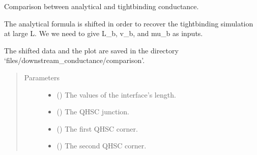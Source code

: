 \documentclass[letterpaper,10pt,english]{sphinxmanual}
\begin{document}

\begin{fulllineitems}
\label{\detokenize{modules:modules.utils.plot_downstream_conductance_comparison}}
\pysigstartsignatures
{}
\pysigstopsignatures
\sphinxAtStartPar
Comparison between analytical and tight\sphinxhyphen{}binding conductance.

\sphinxAtStartPar
The analytical formula is shifted in order to recover the tight\sphinxhyphen{}binding simulation at large L.
We we need to give L\_b, v\_b, and mu\_b as inputs.

\sphinxAtStartPar
The shifted data and the plot are saved in the directory ‘files/downstream\_conductance/comparison’.
\begin{quote}\begin{description}
\item[{Parameters}] \leavevmode\begin{itemize}
\item {} 
\sphinxAtStartPar
{} () \textendash{} The values of the interface’s length.

\item {} 
\sphinxAtStartPar
{} () \textendash{} The QH\sphinxhyphen{}SC junction.

\item {} 
\sphinxAtStartPar
{} () \textendash{} The first QH\sphinxhyphen{}SC corner.

\item {} 
\sphinxAtStartPar
{} () \textendash{} The second QH\sphinxhyphen{}SC corner.


\end{itemize}
\end{description}
\end{quote}
\end{fulllineitems}
\end{document}

